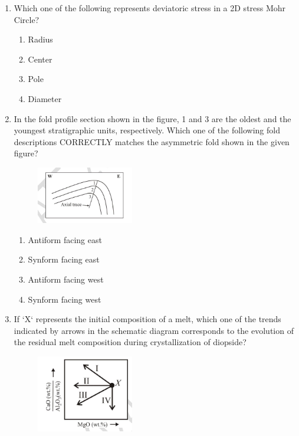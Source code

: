\documentclass[journal,12pt,onecolumn]{IEEEtran}
\begin{document}
\begin{enumerate}
\item Which one of the following represents deviatoric stress in a 2D stress Mohr Circle?  

\hfill{}

\begin{multicols}{4}
\begin{enumerate}
\item Radius
\item Center
\item Pole
\item Diameter
\end{enumerate}
\end{multicols}

\item In the fold profile section shown in the figure, 1 and 3 are the oldest and the youngest stratigraphic units, respectively. Which one of the following fold descriptions CORRECTLY matches the asymmetric fold shown in the given figure?  

\begin{figure}[h!]
    \centering
    \includegraphics[width=0.4\textwidth]{figs/fig6.png}
    \caption{}
    \label{fig:q18}
\end{figure}


\hfill{}

\begin{multicols}{2}
\begin{enumerate}
\item Antiform facing east
\item Synform facing east
\item Antiform facing west
\item Synform facing west
\end{enumerate}
\end{multicols}

\item If `X` represents the initial composition of a melt, which one of the trends indicated by arrows in the schematic diagram corresponds to the evolution of the residual melt composition during crystallization of diopside?  


\begin{figure}[h!]
    \centering
    \includegraphics[width=0.4\textwidth]{figs/fig7.png}
    \caption{}
    \label{fig:q18}
\end{figure}


\end{enumerate}
\end{document}
